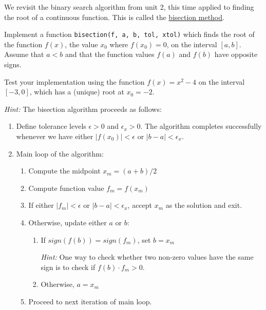 \documentclass{scrartcl}
\providecommand{\tightlist}{%
      \setlength{\itemsep}{0pt}\setlength{\parskip}{0pt}}
\begin{document}
We revisit the binary search algorithm from unit 2, this time applied to
finding the root of a continuous function. This is called the
\href{https://en.wikipedia.org/wiki/Bisection_method}{bisection method}.

Implement a function \texttt{bisection(f,\ a,\ b,\ tol,\ xtol)} which
finds the root of the function \(f(x)\), \ie the value \(x_0\) where
\(f(x_0) = 0\), on the interval \([a,b]\). Assume that \(a<b\) and that
the function values \(f(a)\) and \(f(b)\) have opposite signs.

Test your implementation using the function \(f(x) = x^2 - 4\) on the
interval \([-3,0]\), which has a (unique) root at \(x_0 = -2\).

\emph{Hint:} The bisection algorithm proceeds as follows:

\begin{enumerate}
\def\labelenumi{\arabic{enumi}.}
\tightlist
\item
  Define tolerance levels \(\epsilon > 0\) and \(\epsilon_x > 0\). The
  algorithm completes successfully whenever we have either
  \(|f(x_0)| < \epsilon\) or \(|b-a|<\epsilon_x\).
\item
  Main loop of the algorithm:

  \begin{enumerate}
  \def\labelenumii{\arabic{enumii}.}
  \tightlist
  \item
    Compute the midpoint \(x_m = (a+b)/2\)
  \item
    Compute function value \(f_m = f(x_m)\)
  \item
    If either \(|f_m| < \epsilon\) or \(|b-a|< \epsilon_x\), accept
    \(x_m\) as the solution and exit.
  \item
    Otherwise, update either \(a\) or \(b\):

    \begin{enumerate}
    \def\labelenumiii{\arabic{enumiii}.}
    \item
      If \(sign(f(b)) = sign(f_m)\), set \(b = x_m\)

      \emph{Hint:} One way to check whether two non-zero values have the
      same sign is to check if \(f(b) \cdot f_m > 0\).
    \item
      Otherwise, \(a = x_m\)
    \end{enumerate}
  \item
    Proceed to next iteration of main loop.
  \end{enumerate}
\end{enumerate}
\end{document}
